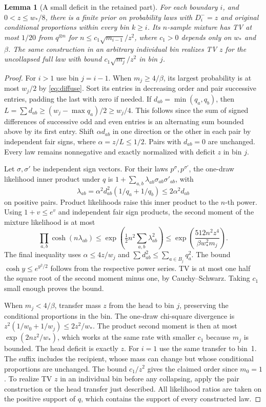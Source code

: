 \documentclass[11pt]{article}
\newtheorem{lemma}[theorem]{Lemma}
\begin{document}
\begin{lemma}[A small deficit in the retained part]\label{lem:prefix}
For each boundary \(i\), and \(0<z\le w_*/8\), there is a finite prior on probability laws with \(D_i^-=z\) and original conditional proportions within every bin \(k\ge i\). Its \(n\)-sample mixture has TV at most \(1/20\) from \(q^{\otimes n}\) for \(n\le c_1\sqrt{m_{i-1}}/z^2\), where \(c_1>0\) depends only on \(w_*\) and \(\beta\). The same construction in an arbitrary individual bin realizes TV \(z\) for the uncollapsed full law with bound \(c_1\sqrt{m_j}/z^2\) in bin \(j\).
\end{lemma}

\begin{proof}
For \(i>1\) use bin \(j=i-1\). When \(m_j\ge4/\beta\), its largest probability is at most \(w_j/2\) by \eqref{eq:diffuse}. Sort its entries in decreasing order and pair successive entries, padding the last with zero if needed. If \(d_{ab}=\min(q_a,q_b)\), then \(L=\sum d_{ab}\ge(w_j-\max q_a)/2\ge w_j/4\). This follows since the sum of signed differences of successive odd and even entries is an alternating sum bounded above by its first entry. Shift \(\alpha d_{ab}\) in one direction or the other in each pair by independent fair signs, where \(\alpha=z/L\le1/2\). Pairs with \(d_{ab}=0\) are unchanged. Every law remains nonnegative and exactly normalized with deficit \(z\) in bin \(j\).

Let \(\sigma,\sigma'\) be independent sign vectors. For their laws \(p^\sigma,p^{\sigma'}\), the one-draw likelihood inner product under \(q\) is \(1+\sum_{a,b}\lambda_{ab}\sigma_{ab}\sigma'_{ab}\), with
\[
 \lambda_{ab}=\alpha^2 d_{ab}^2(1/q_a+1/q_b)\le2\alpha^2d_{ab}
\]
on positive pairs. Product likelihoods raise this inner product to the \(n\)-th power. Using \(1+v\le e^v\) and independent fair sign products, the second moment of the mixture likelihood is at most
\[
 \prod_{a,b}\cosh(n\lambda_{ab})
 \le \exp\!\left(\tfrac12 n^2\sum_{a,b}\lambda_{ab}^2\right)
 \le \exp\!\left(\frac{512 n^2 z^4}{\beta w_*^2 m_j}\right).
\]
The final inequality uses \(\alpha\le4z/w_j\) and \(\sum d_{ab}^2\le\sum_{a\in B_j}q_a^2\). The bound \(\cosh y\le e^{y^2/2}\) follows from the respective power series. TV is at most one half the square root of the second moment minus one, by Cauchy--Schwarz. Taking \(c_1\) small enough proves the bound.

When \(m_j<4/\beta\), transfer mass \(z\) from the head to bin \(j\), preserving the conditional proportions in the bin. The one-draw chi-square divergence is \(z^2(1/w_0+1/w_j)\le2z^2/w_*\). The product second moment is then at most \(\exp(2nz^2/w_*)\), which works at the same rate with smaller \(c_1\) because \(m_j\) is bounded. The head deficit is exactly \(z\). For \(i=1\) use the same transfer to bin~1. The suffix includes the recipient, whose mass can change but whose conditional proportions are unchanged. The bound \(c_1/z^2\) gives the claimed order since \(m_0=1\). To realize TV \(z\) in an individual bin before any collapsing, apply the pair construction or the head transfer just described. All likelihood ratios are taken on the positive support of \(q\), which contains the support of every constructed law.
\end{proof}
\end{document}
